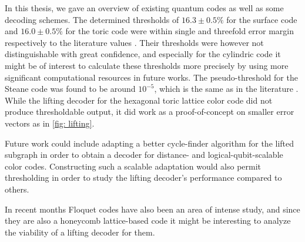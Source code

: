 In this thesis, we gave an overview of existing
quantum codes as well as some decoding schemes.
The determined thresholds of $16.3\pm 0.5 \%$ for the surface code
and $16.0\pm0.5\%$ for the toric code were within single and threefold error margin
respectively to the literature values \cite{surfaceToricThreshold}. 
Their thresholds were however not distinguishable with great confidence, 
and especially for the cylindric code it might be of interest to 
calculate these thresholds more precisely by using more significant computational
resources in future works.
The pseudo-threshold for the Steane code was found to be around $10^{-5}$, which is
the same as in the literature \cite{steaneThreshold}. 
While the lifting decoder for the hexagonal toric lattice color code did not produce
thresholdable output, it did work as a proof-of-concept on smaller error vectors as in
\ref{fig: lifting}.

Future work could include adapting a better cycle-finder algorithm for the lifted 
subgraph in order to obtain a decoder for distance- and logical-qubit-scalable color codes.
Constructing such a scalable adaptation would also permit thresholding in order to study the
lifting decoder's performance compared to others.

In recent months Floquet codes \cite{floquet} have also been an area of intense study, and 
since they are also a honeycomb lattice-based code it might be interesting to analyze the
viability of a lifting decoder for them.